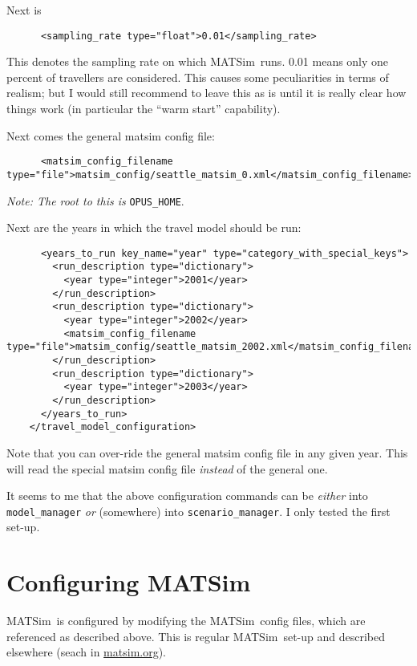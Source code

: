 \documentclass{article}
\def\matsim{MATSim}
\begin{document}
Next is
\begin{verbatim}
      <sampling_rate type="float">0.01</sampling_rate>
\end{verbatim}
This denotes the sampling rate on which \matsim\ runs.  0.01 means
only one percent of travellers are considered.  This causes some
peculiarities in terms of realism; but I would still recommend to
leave this as is until it is really clear how things work (in
particular the ``warm start'' capability).

Next comes the general matsim config file:
{\footnotesize
\begin{verbatim}
      <matsim_config_filename type="file">matsim_config/seattle_matsim_0.xml</matsim_config_filename>
\end{verbatim}
}
\emph{Note: The root to this is} \verb$OPUS_HOME$.

Next are the years in which the travel model should be run:
{\footnotesize
\begin{verbatim}
      <years_to_run key_name="year" type="category_with_special_keys">
        <run_description type="dictionary">
          <year type="integer">2001</year>
        </run_description>
        <run_description type="dictionary">
          <year type="integer">2002</year>
          <matsim_config_filename type="file">matsim_config/seattle_matsim_2002.xml</matsim_config_filename>
        </run_description>
        <run_description type="dictionary">
          <year type="integer">2003</year>
        </run_description>
      </years_to_run>
    </travel_model_configuration>
\end{verbatim}
}
Note that you can over-ride the general matsim config file in any given
year.  This will read the special matsim config file \emph{instead} of
the general one.

It seems to me that the above configuration commands can be
\emph{either} into \verb$model_manager$ \emph{or} (somewhere) into
\verb$scenario_manager$.  I only tested the first set-up.


\section{Configuring \matsim}

\matsim\ is configured by modifying the \matsim\ config files, which
are referenced as described above.  This is regular \matsim\ set-up
and described elsewhere (seach in \url{matsim.org}).
\end{document}
